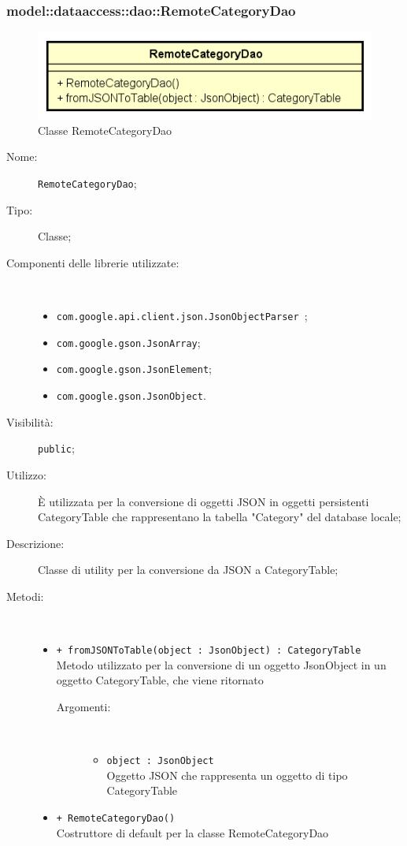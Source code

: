 \documentclass[../DefinizioneDiProdotto.tex]{subfiles}
\begin{document}
\subsubsection{model::dataaccess::dao::RemoteCategoryDao}

    \begin{figure}[H]
        \centering
        \includegraphics{img/RemoteCategoryDao.png}
        \caption{Classe RemoteCategoryDao}\label{fig:model::dataaccess::dao::RemoteCategoryDao} 
    \end{figure}
    \begin{description}
\item[Nome:] \texttt{RemoteCategoryDao};
\item[Tipo:] Classe;
\item[Componenti delle librerie utilizzate:] \
\begin{itemize}
\item \texttt{com.google.api.client.json.JsonObjectParser
};

\item \texttt{com.google.gson.JsonArray};

\item \texttt{com.google.gson.JsonElement};

\item \texttt{com.google.gson.JsonObject}.

\end{itemize}
\item[Visibilità:] \texttt{public};
\item[Utilizzo:] È utilizzata per la conversione di oggetti JSON in oggetti persistenti CategoryTable che rappresentano la tabella "Category" del database locale;
\item[Descrizione:] Classe di utility per la conversione da JSON a CategoryTable;
\item[Metodi:] \
\begin{itemize}
\item \texttt{+ fromJSONToTable(object : JsonObject) : CategoryTable}\\
Metodo utilizzato per la conversione di un oggetto JsonObject in un oggetto CategoryTable, che viene ritornato
 \begin{description}
\item[Argomenti:] \
\begin{itemize}
\item \texttt{object : JsonObject}\\
Oggetto JSON che rappresenta un oggetto di tipo CategoryTable\end{itemize}
\end{description}
\item \texttt{+ RemoteCategoryDao()}\\
Costruttore di default per la classe RemoteCategoryDao
 \end{itemize}
\end{description}
\end{document}
